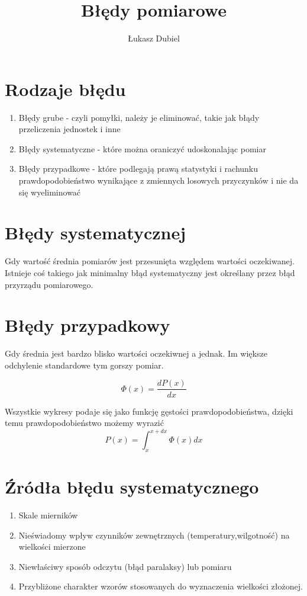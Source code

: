 \documentclass[11pt]{article}
\author{Łukasz Dubiel}
\title{Błędy pomiarowe}
\begin{document}
\maketitle

\section{Rodzaje błędu}
\begin{enumerate}
\item{Błędy grube - czyli pomyłki, należy je eliminować, takie jak błądy przeliczenia jednostek i inne}
\item{Błędy systematyczne - które można oraniczyć udoskonalając pomiar}
\item{Błędy przypadkowe - które podlegają prawą statystyki i rachunku prawdopodobieństwo  wynikające z zmiennych losowych przyczynków i nie da się wyeliminować}
\end{enumerate}

\section{Błędy systematycznej}
Gdy wartość średnia pomiarów jest przesunięta względem wartości oczekiwanej. Istnieje coś takiego jak minimalny błąd systematyczny jest określany przez błąd przyrządu pomiarowego.
\section{Błędy przypadkowy}
Gdy średnia jest bardzo blisko wartości oczekiwnej a jednak. Im większe odchylenie standardowe tym gorszy pomiar.

$$ \Phi(x) = \frac{dP(x)}{dx} $$

Wszystkie wykresy podaje się jako funkcję gęstości prawdopodobieństwa, dzięki temu prawdopodobieństwo możemy wyrazić 
$$ P(x) = \int_{x}^{x+dx} \Phi(x)dx $$

\section{Źródła błędu systematycznego}
\begin{enumerate}
\item{Skale mierników}
\item{Nieświadomy wpływ czynników zewnętrznych (temperatury,wilgotność) na wielkości mierzone}
\item{Niewłaściwy sposób odczytu (błąd paralaksy) lub pomiaru}
\item{Przybliżone charakter wzorów stosowanych do wyznaczenia wielkości złożonej.}
\end{enumerate}
\end{document}
